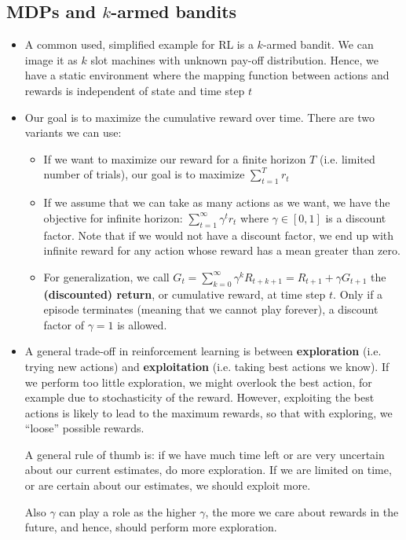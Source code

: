 \subsection{MDPs and $k$-armed bandits}
\begin{itemize}
	\item A common used, simplified example for RL is a $k$-armed bandit. We can image it as $k$ slot machines with unknown pay-off distribution. Hence, we have a static environment where the mapping function between actions and rewards is independent of state and time step $t$
	\item Our goal is to maximize the cumulative reward over time. There are two variants we can use:
	\begin{itemize}
		\item If we want to maximize our reward for a finite horizon $T$ (i.e. limited number of trials), our goal is to maximize $\sum_{t=1}^{T} r_t$
		\item If we assume that we can take as many actions as we want, we have the objective for infinite horizon: $\sum_{t=1}^{\infty} \gamma^{t}r_t$ where $\gamma\in [0,1]$ is a discount factor. Note that if we would not have a discount factor, we end up with infinite reward for any action whose reward has a mean greater than zero.
		\item For generalization, we call $G_t=\sum_{k=0}^{\infty} \gamma^{k}R_{t+k+1}=R_{t+1}+\gamma G_{t+1}$ the \textbf{(discounted) return}, or cumulative reward, at time step $t$. Only if a episode terminates (meaning that we cannot play forever), a discount factor of $\gamma=1$ is allowed.
	\end{itemize} 
	\item A general trade-off in reinforcement learning is between \textbf{exploration} (i.e. trying new actions) and \textbf{exploitation} (i.e. taking best actions we know). If we perform too little exploration, we might overlook the best action, for example due to stochasticity of the reward. However, exploiting the best actions is likely to lead to the maximum rewards, so that with exploring, we ``loose'' possible rewards.
	
	A general rule of thumb is: if we have much time left or are very uncertain about our current estimates, do more exploration. If we are limited on time, or are certain about our estimates, we should exploit more. 
	
	Also $\gamma$ can play a role as the higher $\gamma$, the more we care about rewards in the future, and hence, should perform more exploration.
	

\end{itemize}
